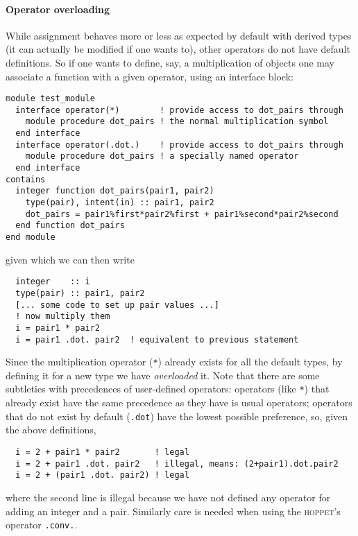 \documentclass[12pt]{article}
\newcommand{\hoppet}{\textsc{hoppet}\xspace}
\begin{document}
\paragraph{Operator overloading} While assignment behaves more or less
as expected by default with derived types (it can actually be modified
if one wants to), other operators do not have default definitions. So
if one wants to define, say, a multiplication of objects one may
associate a function with a given operator, using an interface block:
\begin{lstlisting}
module test_module
  interface operator(*)        ! provide access to dot_pairs through 
    module procedure dot_pairs ! the normal multiplication symbol
  end interface 
  interface operator(.dot.)    ! provide access to dot_pairs through
    module procedure dot_pairs ! a specially named operator
  end interface 
contains
  integer function dot_pairs(pair1, pair2)
    type(pair), intent(in) :: pair1, pair2
    dot_pairs = pair1%first*pair2%first + pair1%second*pair2%second
  end function dot_pairs
end module
\end{lstlisting}
given which we can then write
\begin{lstlisting}
  integer    :: i
  type(pair) :: pair1, pair2
  [... some code to set up pair values ...]
  ! now multiply them
  i = pair1 * pair2
  i = pair1 .dot. pair2  ! equivalent to previous statement
\end{lstlisting}
Since the multiplication operator (\texttt{*}) already exists for
all the default types, by defining it for a new type we have
\emph{overloaded} it. Note that there are some subtleties with
precedences of user-defined operators: operators (like \texttt{*})
that already exist have the same precedence as they have is usual
operators; operators that do not exist by default (\texttt{.dot}) have
the lowest possible preference, so, given the above definitions,
\begin{lstlisting}
  i = 2 + pair1 * pair2       ! legal
  i = 2 + pair1 .dot. pair2   ! illegal, means: (2+pair1).dot.pair2
  i = 2 + (pair1 .dot. pair2) ! legal
\end{lstlisting}
where the second line is illegal because we have not defined any
operator for adding an integer and a pair. Similarly care is needed
when using the \hoppet's operator \texttt{.conv.}.
\end{document}
